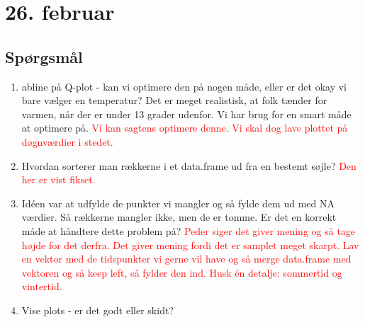 \pagebreak

\section{26. februar}



\subsection{Spørgsmål}
\begin{enumerate}
    \item abline på Q-plot - kan vi optimere den på nogen måde, eller er det okay vi bare vælger en temperatur? Det er meget realistisk, at folk tænder for varmen, når der er under 13 grader udenfor. Vi har brug for en smart måde at optimere på. \textcolor{red}{Vi kan sagtens optimere denne. Vi skal dog lave plottet på døgnværdier i stedet.}
    \item Hvordan sorterer man rækkerne i et data.frame ud fra en bestemt søjle? \textcolor{red}{Den her er vist fikset.}
    \item Idéen var at udfylde de punkter vi mangler og så fylde dem ud med NA værdier. Så rækkerne mangler ikke, men de er tomme. Er det en korrekt måde at håndtere dette problem på? \textcolor{red}{Peder siger det giver mening og så tage højde for det derfra. Det giver mening fordi det er samplet meget skarpt. Lav en vektor med de tidspunkter vi gerne vil have og så merge data.frame med vektoren og så keep left, så fylder den ind. Husk én detalje: sommertid og vintertid.}
    \item Vise plots - er det godt eller skidt? 
\end{enumerate} 

